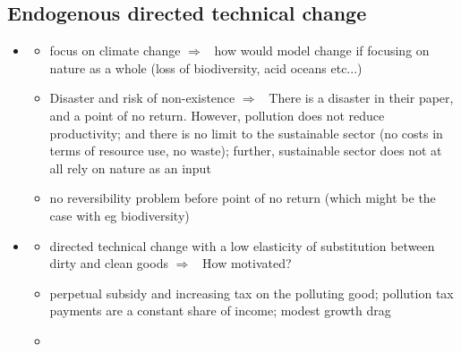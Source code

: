 \documentclass[12pt]{article}
\newcommand{\ar}{$\Rightarrow$ \ }
\begin{document}
\subsection{Endogenous directed technical change}
\begin{itemize}
	\item \cite{Acemoglu2012TheChange}
	\begin{itemize}
		\item focus on climate change \ar how would model change if focusing on nature as a whole (loss of biodiversity, acid oceans etc...)
\item 	Disaster and risk of non-existence \ar There is a disaster in their paper, and a point of no return. However, pollution does not reduce productivity; and there is no limit to the sustainable sector (no costs in terms of resource use, no waste); further, sustainable sector does not at all rely on nature as an input
\item no reversibility problem before point of no return (which might be the case with eg biodiversity)
	\end{itemize}	
	\item \cite{Eriksson2018PhasingChange}
	\begin{itemize}
\item directed technical change with  a low elasticity of substitution between dirty and clean goods \ar How motivated?
\item perpetual subsidy and increasing tax on the polluting good; pollution tax payments are a constant share of income; modest growth drag
\item 
	\end{itemize}
\end{itemize} 
\end{document}
